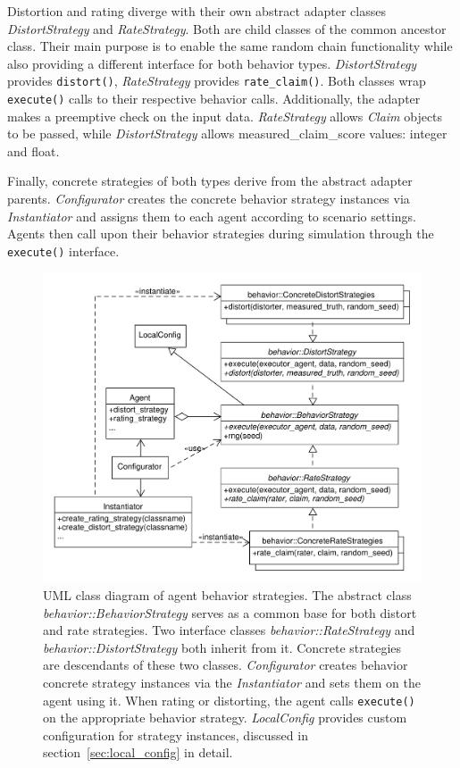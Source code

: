 \documentclass[%
    ]{\PathToTumTemplate/thesis/tum_thesis}
\begin{document}
Distortion and rating diverge with their own abstract adapter classes \emph{DistortStrategy} and \emph{RateStrategy}.
Both are child classes of the common ancestor class.
Their main purpose is to enable the same random chain functionality while also providing a different interface for both behavior types.
\emph{DistortStrategy} provides \texttt{distort()}, \emph{RateStrategy} provides \texttt{rate\_claim()}.
Both classes wrap \texttt{execute()} calls to their respective behavior calls.
Additionally, the adapter makes a preemptive check on the input data.
\emph{RateStrategy} allows \emph{Claim} objects to be passed, while \emph{DistortStrategy} allows \gls{measured_claim_score} values: integer and float.

Finally, concrete strategies of both types derive from the abstract adapter parents.
\emph{Configurator} creates the concrete behavior strategy instances via \emph{Instantiator} and assigns them to each agent according to scenario settings.
Agents then call upon their behavior strategies during simulation through the \texttt{execute()} interface.

\begin{figure}[tbp]
  \begin{center}
        \includegraphics[width=1\linewidth]	{../uml/behavior_strategies.pdf}
    \caption{
	UML class diagram of agent behavior strategies.
	The abstract class \emph{behavior::BehaviorStrategy} serves as a common base for both distort and rate strategies.
	Two interface classes \emph{behavior::RateStrategy} and \emph{behavior::DistortStrategy} both inherit from it.
	Concrete strategies are descendants of these two classes.
	\emph{Configurator} creates behavior concrete strategy instances via the \emph{Instantiator} and sets them on the agent using it.
	When rating or distorting, the agent calls \lstinline{execute()} on the appropriate behavior strategy.
	\emph{LocalConfig} provides custom configuration for strategy instances, discussed in section~\ref{sec:local_config} in detail.
    }
    \label{fig:behavior_strategies}
  \end{center}
\end{figure}
\end{document}
